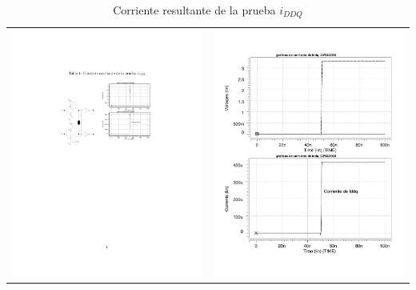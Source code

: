 \documentclass[12pt]{article}
\begin{document}
\begin{table}[ht]
\caption{Corriente resultante de la prueba $i_{DDQ}$}
\centering
\begin{tabular}{cc}
  \includegraphics[width=0.3\linewidth]{iddq}&\includegraphics[width=0.45\linewidth]{g_iddq}\\
\end{tabular}
\label{tab:iddq}
\end{table}
\end{document}

